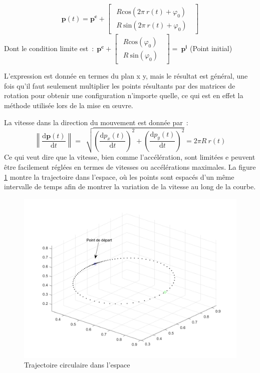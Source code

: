 \documentclass{article} %
\begin{document}
\[\boldsymbol{p}\left(t\right)={\boldsymbol{p}}^{\boldsymbol{c}}+\left[ \begin{array}{c}
 \begin{array}{c}
R{\mathrm{cos} (2\pi \ r\left(t\right)+{\varphi }_0)\ } \\ 
R\ {\mathrm{sin} (2\pi \ r\left(t\right)+{\varphi }_0)\ } \end{array}
 \end{array}
\right]\] 
Dont le condition limite est~:$\boldsymbol{\ }\boldsymbol{\ }{\boldsymbol{p}}^{\boldsymbol{c}}+\left[ \begin{array}{c}
 \begin{array}{c}
R{\mathrm{cos} ({\varphi }_0)\ } \\ 
R\ {\mathrm{sin} ({\varphi }_0)\ } \end{array}
 \end{array}
\right]=\ {\boldsymbol{p}}^{\boldsymbol{i}}$\textbf{ }(Point initial)

\bigbreak

L'expression est donn\'{e}e en termes du plan x y, mais le r\'{e}sultat est g\'{e}n\'{e}ral, une fois qu'il faut seulement multiplier les points r\'{e}sultants par des matrices de rotation pour obtenir une configuration n'importe quelle, ce qui est en effet la m\'{e}thode utilis\'{e}e lors de la mise en {\oe}uvre.

La vitesse dans la direction du mouvement est donn\'{e}e par~:
\[\left\|\frac{\textrm{d}\boldsymbol{p}(t)}{\textrm{d}t}\right\|=\ \ \sqrt{{\left(\frac{\textrm{d}p_x(t)}{\textrm{d}t}\right)}^2+{\left(\frac{\textrm{d}p_y(t)}{\textrm{d}t}\right)}^2}=2\pi R\ r(t)\] 
Ce qui veut dire que la vitesse, bien comme l'acc\'{e}l\'{e}ration, sont limit\'{e}es e peuvent \^{e}tre facilement r\'{e}gl\'{e}es en termes de vitesses ou acc\'{e}l\'{e}rations maximales. La figure \ref{eller4} montre la trajectoire dans l'espace, o\`{u} les points sont espac\'{e}s d'un m\^{e}me intervalle de temps afin de montrer la variation de la vitesse au long de la courbe. 

\begin{figure}[h!]
		\includegraphics[width=\textwidth]{TrajFig4.png}
		\caption{Trajectoire circulaire dans l'espace}
		\label{eller4}	
\end{figure}
\end{document}
